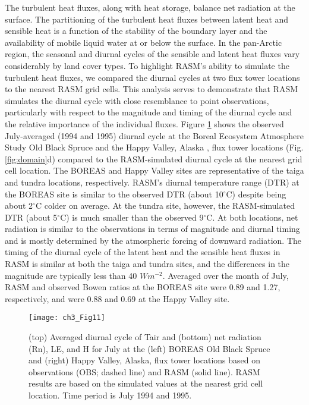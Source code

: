 The turbulent heat fluxes, along with heat storage, balance net radiation at the surface.
The partitioning of the turbulent heat fluxes between latent heat and sensible heat is a function of the stability of the boundary layer and the availability of mobile liquid water at or below the surface.
In the pan-Arctic region, the seasonal and diurnal cycles of the sensible and latent heat fluxes vary considerably by land cover types.
To highlight RASM’s ability to simulate the turbulent heat fluxes, we compared the diurnal cycles at two flux tower locations to the nearest RASM grid cells.
This analysis serves to demonstrate that RASM simulates the diurnal cycle with close resemblance to point observations, particularly with respect to the magnitude and timing of the diurnal cycle and the relative importance of the individual fluxes.
Figure \ref{fig:diurnal_cycle} shows the observed July-averaged (1994 and 1995) diurnal cycle at the Boreal Ecosystem Atmosphere Study \citep[BOREAS; ][]{Sellers_1997} Old Black Spruce \citep{Barr_2006} and the Happy Valley, Alaska \citep{Eugster_2000}, flux tower locations (Fig. \ref{fig:domain}d) compared to the RASM-simulated diurnal cycle at the nearest grid cell location.
The BOREAS and Happy Valley sites are representative of the taiga and tundra locations, respectively.
RASM’s diurnal temperature range (DTR) at the BOREAS site is similar to the observed DTR (about 10$^{\circ}$C) despite being about 2$^{\circ}$C colder on average.
At the tundra site, however, the RASM-simulated DTR (about 5$^{\circ}$C) is much smaller than the observed 9$^{\circ}$C.
At both locations, net radiation is similar to the observations in terms of magnitude and diurnal timing and is mostly determined by the atmospheric forcing of downward radiation.
The timing of the diurnal cycle of the latent heat and the sensible heat fluxes in RASM is similar at both the taiga and tundra sites, and the differences in the magnitude are typically less than 40 $W m^{-2}$.
Averaged over the month of July, RASM and observed Bowen ratios at the BOREAS site were 0.89 and 1.27, respectively, and were 0.88 and 0.69 at the Happy Valley site.

\begin{figure}
  \centering
  \texttt{[image: ch3\_Fig11]}
  \caption{(top) Averaged diurnal cycle of Tair and (bottom) net radiation (Rn), LE, and H for July at the (left) BOREAS Old Black Spruce and (right) Happy Valley, Alaska, flux tower locations based on observations (OBS; dashed line) and RASM (solid line).
  RASM results are based on the simulated values at the nearest grid cell location.
  Time period is July 1994 and 1995.}
  \label{fig:diurnal_cycle}
\end{figure}

